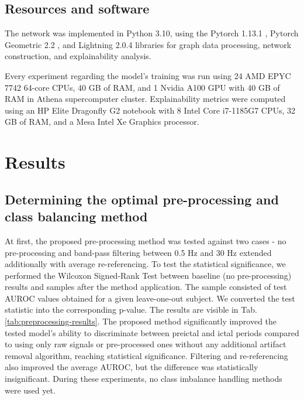 \documentclass[a4paper,fleqn]{cas-sc}
\begin{document}
\subsection{Resources and software}
The network was implemented in Python 3.10, using the Pytorch 1.13.1 \cite{PaszkeTorch}, Pytorch Geometric 2.2 \cite{FeyPytorchGeometric}, and Lightning 2.0.4 \cite{falcon2019lightning} libraries for graph data processing, network construction, and explainability analysis.

Every experiment regarding the model's training was run using 24 AMD EPYC 7742 64-core CPUs, 40 GB of RAM, and 1 Nvidia A100 GPU with 40 GB of RAM in Athena supercomputer cluster. Explainability metrics were computed using an HP Elite Dragonfly G2 notebook with 8 Intel Core i7-1185G7 CPUs, 32 GB of RAM, and a Mesa Intel Xe Graphics processor.

\section{Results}
\subsection{Determining the optimal pre-processing and class balancing method}
At first, the proposed pre-processing method was tested against two cases - no pre-processing and band-pass filtering between 0.5 Hz and 30 Hz extended additionally with average re-referencing. To test the statistical significance, we performed the Wilcoxon Signed-Rank Test between baseline (no pre-processing) results and samples after the method application. The sample consisted of test AUROC values obtained for a given leave-one-out subject. We converted the test statistic into the corresponding p-value. The results are visible in Tab. \ref{tab:preprocessing-results}. The proposed method significantly improved the tested model's ability to discriminate between preictal and ictal periods compared to using only raw signals or pre-processed ones without any additional artifact removal algorithm, reaching statistical significance. Filtering and re-referencing also improved the average AUROC, but the difference was statistically insignificant.
During these experiments, no class imbalance handling methods were used yet.
\end{document}
